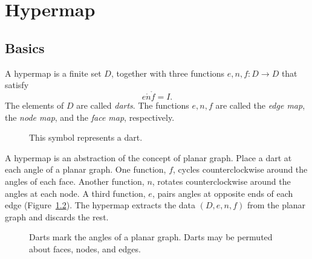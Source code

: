 

\chapter{Hypermap}\label{chap:hypermap}

\section{Basics}



\begin{definition}[hypermap]\label{def:hypermap}  A hypermap is a finite set $D$, together with
three functions $e,n,f:D\to D$ that satisfy
    $$e\ocirc n\ocirc f = I.$$
The elements of $D$ are called {\it darts}.  The functions $e,n,f$
are called the {\it edge map}, the {\it node map}, and the {\it
face map}, respectively.
\end{definition}

\begin{figure}[htb]
  \centering
  \caption{This symbol represents a dart.}
  \label{fig:dart}
\end{figure}

\begin{remark} A hypermap is an abstraction of
the concept of 
planar graph.  Place a dart at each angle of a planar graph.
One function, $f$, 
cycles counterclockwise around the angles of each face.  
Another function, $n$, 
rotates counterclockwise around the angles at each
node.  A third function, $e$, pairs angles at opposite ends of
each edge  (Figure~\ref{fig:hypermap_ex}).   The hypermap extracts
the data $(D,e,n,f)$ from the planar graph and discards the rest.
\end{remark}

\begin{figure}[htb]
  \centering
  \caption{Darts mark the angles of a planar graph.  Darts may
  be permuted about faces, nodes, and edges.}
  \label{fig:hypermap_ex}
\end{figure}

